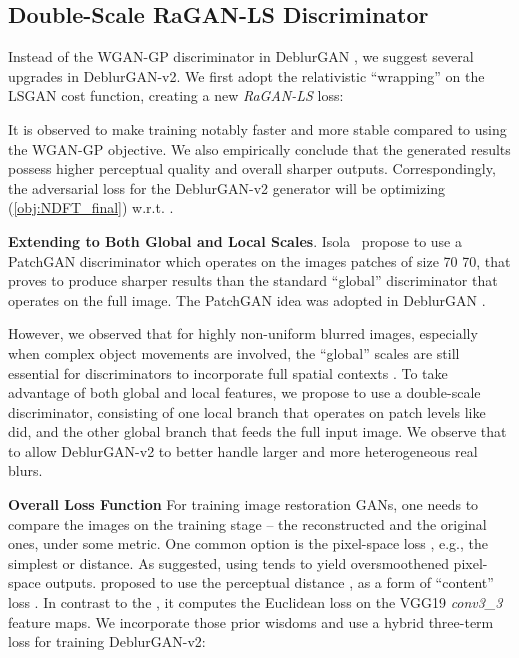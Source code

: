 \documentclass[10pt,twocolumn,letterpaper]{article}
\begin{document}
\subsection{Double-Scale RaGAN-LS Discriminator}
\vspace{-0.5em}
\label{s:method}



Instead of the WGAN-GP discriminator in DeblurGAN \cite{kupyn2018deblurgan}, we suggest several upgrades in DeblurGAN-v2. We first adopt the relativistic ``wrapping'' \cite{jolicoeur2018relativistic} on the LSGAN \cite{LSGAN} cost function, creating a new \textit{RaGAN-LS} loss:

It is observed to make training notably faster and more stable compared to using the WGAN-GP objective. We also empirically conclude that the generated results possess higher perceptual quality and overall sharper outputs. Correspondingly, the adversarial loss  for the DeblurGAN-v2 generator will be optimizing (\ref{obj:NDFT_final}) w.r.t. . 










\textbf{Extending to Both Global and Local Scales}.
 Isola~\etal\cite{pix2pix} propose to use a PatchGAN discriminator which operates on the images patches of size 70  70, that proves to produce sharper results than the standard ``global'' discriminator that operates on the full image. The PatchGAN idea was adopted in DeblurGAN \cite{kupyn2018deblurgan}.
 
 However, we observed that for highly non-uniform blurred images, especially when complex object movements are involved, the ``global'' scales are still essential for discriminators to incorporate full spatial contexts \cite{jiang2019enlightengan}. To take advantage of both global and local features, we propose to use a double-scale discriminator, consisting of one local branch that operates on patch levels like \cite{pix2pix} did, and the other global branch that feeds the full input image. We observe that to allow DeblurGAN-v2 to better handle larger and more heterogeneous real blurs. 
 


\textbf{Overall Loss Function}
For training image restoration GANs, one needs to compare the images on the training stage – the reconstructed and the original ones, under some metric. One common option is the pixel-space loss , e.g., the simplest  or  distance.  As \cite{SRGAN} suggested, using  tends to yield oversmoothened pixel-space outputs. 
\cite{kupyn2018deblurgan} proposed to use the perceptual distance \cite{Johnson2016Perceptual}, as a form of ``content'' loss . In contrast to the , it computes the Euclidean loss on the VGG19 \cite{VGGNet2014} \textit{conv3\_3} feature maps.  We incorporate those prior wisdoms and use a hybrid three-term loss for training DeblurGAN-v2:
\end{document}

